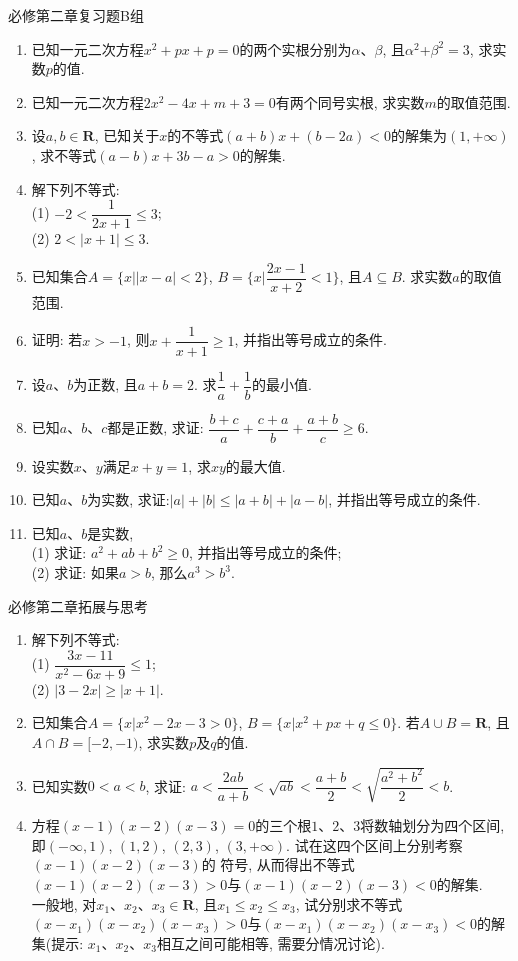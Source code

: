 \documentclass[10pt,a4paper]{article}
\begin{document}
必修第二章复习题B组
\begin{enumerate}[1.]
\item 已知一元二次方程$x^2+px+p=0$的两个实根分别为$\alpha$、$\beta$, 且$\alpha^2$+$\beta^2=3$, 求实数$p$的值.
\item 已知一元二次方程$2x^2-4x+m+3=0$有两个同号实根, 求实数$m$的取值范围.
\item 设$a,b\in \mathbf{R}$, 已知关于$x$的不等式$(a+b)x+(b-2a)<0$的解集为$(1, +\infty)$, 求不等式$(a-b)x+3b-a>0$的解集.
\item 解下列不等式:\\
(1) $-2< \dfrac 1{2x+1}\le 3$;\\
(2) $2<|x+1|\le 3$.
\item 已知集合$A=\{x||x-a|<2\}$, $B=\{x|\dfrac{2x-1}{x+2}<1\}$, 且$A\subseteq B$. 求实数$a$的取值范围.
\item 证明: 若$x>-1$, 则$x+\dfrac 1{x+1}\ge 1$, 并指出等号成立的条件.
\item 设$a$、$b$为正数, 且$a+b=2$. 求$\dfrac 1a+\dfrac 1b$的最小值.
\item 已知$a$、$b$、$c$都是正数, 求证: $\dfrac{b+c}{a}+\dfrac{c+a}{b}+\dfrac{a+b}{c}\ge 6$.
\item 设实数$x$、$y$满足$x+y=1$, 求$xy$的最大值.
\item 已知$a$、$b$为实数, 求证:$|a|+|b| \le |a+b| +|a-b|$, 并指出等号成立的条件.
\item 已知$a$、$b$是实数,\\
(1) 求证: $a^2+ab+b^2\ge 0$, 并指出等号成立的条件;\\
(2) 求证: 如果$a>b$, 那么$a^3>b^3$. 
\end{enumerate}

必修第二章拓展与思考
\begin{enumerate}[1.]
\item 解下列不等式:\\
(1) $\dfrac{3x-11}{x^2-6x+9}\le 1$;\\
(2) $|3-2x| \ge |x+1|$.
\item 已知集合$A=\{x|x^2-2x-3>0\}$, $B=\{x|x^2+px+q\le 0\}$. 若$A\cup B=\mathbf{R}$, 且$A\cap B=[-2,-1)$, 求实数$p$及$q$的值.
\item 已知实数$0<a<b$, 求证: $a<\dfrac{2ab}{a+b}<\sqrt{ab}<\dfrac{a+b}{2}<\sqrt{\dfrac{a^2+b^2}{2}}<b$.
\item 方程$(x-1)(x-2)(x-3)=0$的三个根$1$、$2$、$3$将数轴划分为四个区间, 即$(-\infty, 1)$, $(1, 2)$, $(2, 3)$, $(3, +\infty)$. 试在这四个区间上分别考察$(x-1)(x-2)(x-3)$的
符号, 从而得出不等式$(x-1)(x-2)(x-3)>0$与$(x-1)(x-2)(x-3)<0$的解集.\\
一般地, 对$x_1$、$x_2$、$x_3\in \mathbf{R}$, 且$x_1\le x_2\le x_3$, 试分别求不等式$(x-x_1)(x-x_2)(x-x_3)>0$与$(x-x_1)(x-x_2)(x-x_3)<0$的解集(提示: $x_1$、$x_2$、$x_3$相互之间可能相等, 需要分情况讨论).
\end{enumerate}
\end{document}
